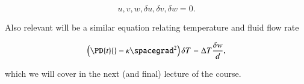 \begin{equation}\label{eqn:continuumL21:n}
u, v, w, \delta u, \delta v, \delta w = 0.
\end{equation}

Also relevant will be a similar equation relating temperature and fluid flow rate

\begin{equation}\label{eqn:continuumL21:270}
\left( \PD{t}{} - \kappa \spacegrad^2 \right) \delta T = \Delta T \frac{\delta w}{d},
\end{equation}

which we will cover in the next (and final) lecture of the course.


\EndNoBibArticle
